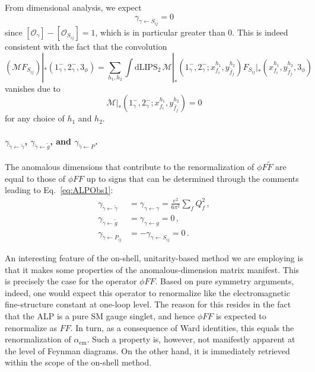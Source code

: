 From dimensional analysis, we expect
\begin{equation}
    \gamma_{\gamma\leftarrow S_{ij}}=0
\end{equation}
since $[\mathcal O_\gamma]-[\mathcal O_{S_{ij}}]=1$, which is in particular greater than $0$.
This is indeed consistent with the fact that the convolution
\begin{equation}
    (\mathcal M F_{S_{ij}})|_*(1^-_\gamma,2^-_\gamma,3_\phi) = \sum_{h_1,h_2}\int \text{dLIPS}_2\, \mathcal M|_*(1^-_\gamma,2^-_\gamma;x_{f_i}^{h_1},y^{h_2}_{\bar f_j})F_{S_{ij}}|_*(x_{f_i}^{h_1},y^{h_2}_{\bar f_j},3_\phi)
\end{equation}
vanishes due to
\begin{equation}
    \mathcal M|_*(1^-_\gamma,2^-_\gamma;x_{f_i}^{h_1},y^{h_2}_{\bar f_j})=0
\end{equation}
for any choice of $h_1$ and $h_2$.

\paragraph{\texorpdfstring{$\gamma_{\tilde\gamma \leftarrow \tilde\gamma}$, $\gamma_{\tilde\gamma \leftarrow \tilde g}$, and $\gamma_{\tilde\gamma \leftarrow P}$}{gamma gammatilde from gammatilde, gtilde, and P}.}
\label{par:ALPPhiFF}
The anomalous dimensions that contribute to the renormalization of $\phi F\widetilde F$ are
equal to those of $\phi FF$ up to signs that can be determined through the comments leading to
Eq.~\eqref{eq:ALPObs1}:
\begin{align}
    \gamma_{\tilde\gamma \leftarrow \tilde\gamma} &= \gamma_{\gamma \leftarrow \gamma} = \frac{e^2}{6\pi^2}\sum_f Q_f^2 \,,\\
    \gamma_{\tilde\gamma \leftarrow \tilde g} &= \gamma_{\gamma \leftarrow  g} = 0\,,\\
    \gamma_{\tilde\gamma \leftarrow P_{ij}} &= -\gamma_{\gamma \leftarrow S_{ij}} = 0\,.
\end{align}

An interesting feature of the on-shell, unitarity-based method we are employing is that it
makes some properties of the anomalous-dimension matrix manifest.
This is precisely the case for the operator $\phi FF$.
Based on pure symmetry arguments, indeed, one would expect this operator to renormalize like
the electromagnetic fine-structure constant at one-loop level.
The reason for this resides in the fact that the ALP is a pure SM gauge singlet, and hence
$\phi FF$ is expected to renormalize as $FF$.
In turn, as a consequence of Ward identities, this equals the renormalization of
$\alpha_{\text{em}}$.
Such a property is, however, not manifestly apparent at the level of Feynman diagrams.
On the other hand, it is immediately retrieved within the scope of the on-shell method.

